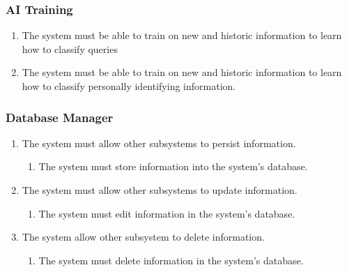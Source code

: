 \documentclass[11pt]{article}
\begin{document}
\subsubsection{AI Training}
\begin{enumerate}[label=R4.\arabic*.]
	\item The system must be able to train on new and historic information to learn how to classify queries
	\item The system must be able to train on new and historic information to learn how to classify personally identifying information.
\end{enumerate}

\subsubsection{Database Manager}
\begin{enumerate}[label=R5.\arabic*.]
	\item The system must allow other subsystems to persist information.
	\begin{enumerate}[label*=\arabic*.]
		\item The system must store information into the system's database.
	\end{enumerate}
	\item The system must allow other subsystems to update information.
	\begin{enumerate}[label*=\arabic*.]
		\item The system must edit information in the system's database.
	\end{enumerate}
	\item The system allow other subsystem to delete information.
	\begin{enumerate}[label*=\arabic*.]
		\item The system must delete information in the system's database.
	\end{enumerate}
\end{enumerate}

\end{document}
